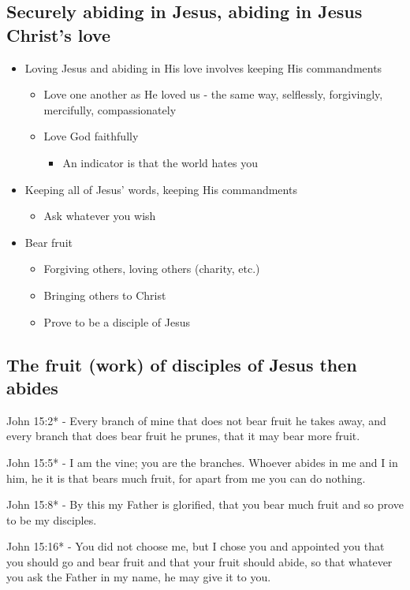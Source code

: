 \documentclass[11pt]{article}
\begin{document}
\subsection{Securely abiding in Jesus, abiding in Jesus Christ's love}
\label{sec:orga0250c3}
\begin{itemize}
\item Loving Jesus and abiding in His love involves keeping His commandments
\begin{itemize}
\item Love one another as He loved us - the same way, selflessly, forgivingly, mercifully, compassionately
\item Love God faithfully
\begin{itemize}
\item An indicator is that the world hates you
\end{itemize}
\end{itemize}
\item Keeping all of Jesus' words, keeping His commandments
\begin{itemize}
\item Ask whatever you wish
\end{itemize}
\item Bear fruit
\begin{itemize}
\item Forgiving others, loving others (charity, etc.)
\item Bringing others to Christ
\item Prove to be a disciple of Jesus
\end{itemize}
\end{itemize}

\subsection{The fruit (work) of disciples of Jesus then abides}
\label{sec:orgab06761}
John 15:2* - Every branch of mine that does not bear fruit he takes away, and every branch that does bear fruit he prunes, that it may bear more fruit.

John 15:5* - I am the vine; you are the branches. Whoever abides in me and I in him, he it is that bears much fruit, for apart from me you can do nothing.

John 15:8* - By this my Father is glorified, that you bear much fruit and so prove to be my disciples.

John 15:16* - You did not choose me, but I chose you and appointed you that you should go and bear fruit and that your fruit should abide, so that whatever you ask the Father in my name, he may give it to you.
\end{document}
